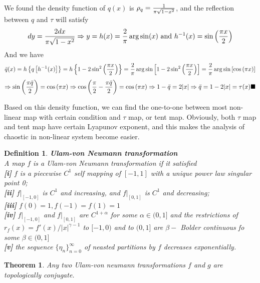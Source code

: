 \documentclass[12pt]{article}
\theoremstyle{plain}
\newtheorem{theorem}{\textbf{Theorem}}[section]
\newtheorem{definition}{\textbf{Definition}}[section]
\begin{document}
We found the density function of $q(x)$ is $\rho_q ={1\over \pi\sqrt{1 - x^2}}$, and the reflection between $q$ and $\tau$ will satisfy 
$$
dy = {2 dx \over\pi \sqrt{1 - x^2}} \Rightarrow y = h(x) = {2\over \pi}\arg\sin(x) \text{ and }h^{-1}(x) = \sin\left({\pi x \over 2}\right)
$$
And we have 
$$
\bar q(x) = h\left\{q\left[h^{-1}(x)\right]\right\} 
= h\left\{1 - 2 \sin^2\left({\pi x \over 2}\right)\right\} 
= {2\over \pi}\arg\sin\left[1 - 2 \sin^2\left({\pi x \over 2}\right)\right]
= {2\over \pi}\arg\sin\left[\cos\left({\pi x}\right)\right]
$$
$$
\Rightarrow \sin {\left(\pi \bar q \over 2\right)} = \cos {\left(\pi x\right)} \Rightarrow \cos \left({\pi \over 2} - {\pi \bar q \over 2}\right) = \cos {\left(\pi x\right)}  \Rightarrow 1 - \bar q = 2|x| \Rightarrow \bar q = 1 - 2|x| = \tau(x) \blacksquare
$$







Based on this density function, we can find the one-to-one between most non-linear map with certain condition and $\tau$ map, or tent map. Obviously, both $\tau$ map and tent map have certain Lyapunov exponent, and this makes the analysis of chaostic in non-linear system become easier.

\begin{definition}\textbf{Ulam-von Neumann transformation}
\\\noindent A map $f$ is a Ulam-von Neumann transformation if it satisfied
\\\noindent \textbf{[i]} $f$ is a piecewise $C^1$ self mapping of $[-1, 1]$ with a unique power law singular point 0;
\\\noindent \textbf{[ii]} $f|_{[-1, 0]}$ is $C^1$ and increasing, and $f|_{[0, 1]}$ is $C^1$ and decreasing;
\\\noindent \textbf{[iii]} $f(0) = 1, f(-1) = f(1) = 1$
\\\noindent \textbf{[iv]} $f|_{[-1, 0]}$ and $f|_{[0, 1]}$ are $C^{1 +\alpha}$ for some $\alpha \in (0, 1]$ and the restrictions of $r_f(x) = f'(x) / |x|^{\gamma - 1}$ to $[-1, 0)$ and to $(0, 1]$ are $\beta -$ Bolder continuous fo some $\beta \in (0, 1]$
\\\noindent \textbf{[v]} the sequence $\{\eta_n\}_{n = 0}^{\infty}$ of neasted partitions by $f$ decreases exponentially.
\end{definition}

\begin{theorem} Any two Ulam-von neumann transformations $f$ and $g$ are topologically conjugate.
\end{theorem}
\end{document}
